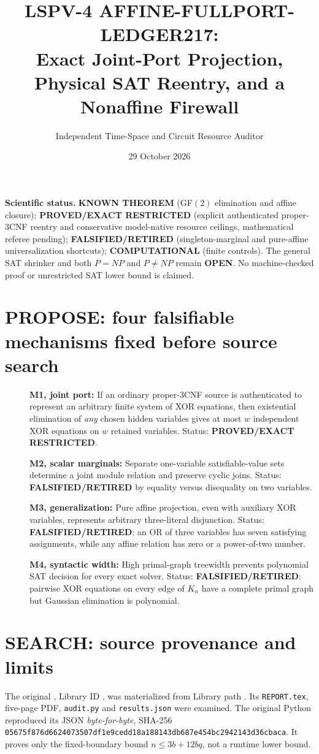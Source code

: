 \documentclass[11pt]{article}
\title{LSPV-4 AFFINE-FULLPORT-LEDGER217:\\Exact Joint-Port Projection, Physical SAT Reentry, and a Nonaffine Firewall}
\author{Independent Time-Space and Circuit Resource Auditor}
\date{29 October 2026}
\begin{document}
\maketitle
\noindent\textbf{Scientific status.} \textbf{KNOWN THEOREM} (GF$(2)$ elimination and affine closure); \textbf{PROVED/EXACT RESTRICTED} (explicit authenticated proper-3CNF reentry and conservative model-native resource ceilings, mathematical referee pending); \textbf{FALSIFIED/RETIRED} (singleton-marginal and pure-affine universalization shortcuts); \textbf{COMPUTATIONAL} (finite controls). The general SAT shrinker and both $P=NP$ and $P\ne NP$ remain \textbf{OPEN}. No machine-checked proof or unrestricted SAT lower bound is claimed.

\section{PROPOSE: four falsifiable mechanisms fixed before source search}
\begin{description}
\item[] \textbf{M1, joint port:} If an ordinary proper-3CNF source is authenticated to represent an arbitrary finite system of XOR equations, then existential elimination of \emph{any} chosen hidden variables gives at most $w$ independent XOR equations on $w$ retained variables. Status: \textbf{PROVED/EXACT RESTRICTED}.
\item[] \textbf{M2, scalar marginals:} Separate one-variable satisfiable-value sets determine a joint module relation and preserve cyclic joins. Status: \textbf{FALSIFIED/RETIRED} by equality versus disequality on two variables.
\item[] \textbf{M3, generalization:} Pure affine projection, even with auxiliary XOR variables, represents arbitrary three-literal disjunction. Status: \textbf{FALSIFIED/RETIRED}: an OR of three variables has seven satisfying assignments, while any affine relation has zero or a power-of-two number.
\item[] \textbf{M4, syntactic width:} High primal-graph treewidth prevents polynomial SAT decision for every exact solver. Status: \textbf{FALSIFIED/RETIRED}: pairwise XOR equations on every edge of $K_n$ have a complete primal graph but Gaussian elimination is polynomial.
\end{description}

\section{SEARCH: source provenance and limits}
The original , Library ID , was materialized from Library path . Its \texttt{REPORT.tex}, five-page PDF, \texttt{audit.py} and \texttt{results.json} were examined. The original Python reproduced its JSON \emph{byte-for-byte}, SHA-256 \texttt{05675f876d6624073507df1e9cedd18a188143db687e454bc2942143d36cbaca}. It proves only the fixed-boundary bound $n\le3b+12bq$, not a runtime lower bound.
\end{document}
